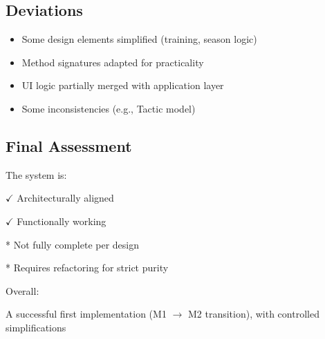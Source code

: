 \documentclass[11pt,a4paper]{article}
\begin{document}
\subsection*{Deviations}

\begin{itemize}
\renewcommand{\labelitemi}{$\bullet$}
\item Some design elements simplified (training, season logic)
\item Method signatures adapted for practicality
\item UI logic partially merged with application layer
\item Some inconsistencies (e.g., Tactic model)
\end{itemize}

\subsection*{Final Assessment}

The system is:

$\checkmark$ Architecturally aligned

$\checkmark$ Functionally working

* Not fully complete per design

* Requires refactoring for strict purity

Overall:

A successful first implementation (M1 $\rightarrow$ M2 transition), with controlled simplifications
\end{document}
